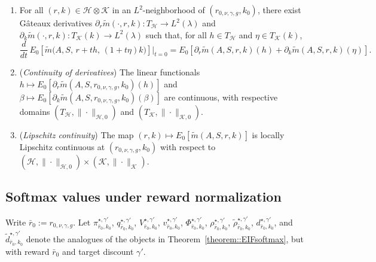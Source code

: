 \documentclass[11pt]{article}
\theoremstyle{plain}
\begin{document}
\begin{enumerate}[label=\textbf{(C\arabic**)}, ref=C\arabic**, series=cond2, start=1]
\item \label{cond::boundedfunc::norm} For all $(r,k) \in \mathcal{H} \otimes \mathcal{K}$ in an $L^2$-neighborhood of $(r_{0,\nu,\gamma,g}, k_0)$, there exist Gâteaux derivatives
$\partial_r \tilde{m}(\cdot, r, k) : T_{\mathcal{H}} \to L^2(\lambda)$
and $\partial_k \tilde{m}(\cdot, r, k) : T_{\mathcal{K}}(k) \to L^2(\lambda)$
such that, for all $h \in T_{\mathcal{H}}$ and $\eta \in T_{\mathcal{K}}(k)$,
\[
   \frac{d}{dt}\, E_0\!\left[\tilde{m}\big(A,S,\, r + t h,\,(1+t\eta)k\big)\right]\Big|_{t=0}
   = E_0\!\left[\partial_r \tilde{m}(A,S,r,k)(h) + \partial_k \tilde{m}(A,S,r,k)(\eta)\right].
\]
\item (\textit{Continuity of derivatives}) \label{cond::boundedfunc2::norm} The linear functionals $h \mapsto E_0[\partial_r \tilde{m}(A,S,r_{0,\nu,\gamma,g},k_0)(h)]$ and
    $\beta \mapsto E_0[\partial_k \tilde{m}(A,S,r_{0,\nu,\gamma,g},k_0)(\beta)]$ are continuous,
    with respective domains $(T_{\mathcal{H}}, \|\cdot\|_{\mathcal{H}, 0})$ and
    $(T_{\mathcal{K}}, \|\cdot\|_{\mathcal{K}, 0})$.
\item (\textit{Lipschitz continuity}) \label{cond::lipschitz::norm} The map $(r,k) \mapsto E_0[\tilde{m}(A,S,r,k)]$ is locally Lipschitz continuous at $(r_{0,\nu,\gamma,g},k_0)$ with respect to $(\mathcal{H}, \|\cdot\|_{\mathcal{H}, 0}) \times (\mathcal{K}, \|\cdot\|_{\mathcal{K}})$.
\end{enumerate}

\subsection{Softmax values under reward normalization}

Write \(\bar r_0 := r_{0,\nu,\gamma,g}\). Let
\(\pi_{\bar r_0,k_0}^{\star,\gamma'}\),
\(q_{\bar r_0,k_0}^{\star,\gamma'}\),
\(V_{\bar r_0,k_0}^{\star,\gamma'}\),
\(v_{\bar r_0,k_0}^{\star,\gamma'}\),
\(\Phi_{\bar r_0,k_0}^{\star,\gamma'}\),
\(\rho_{\bar r_0,k_0}^{\star,\gamma'}\),
\(\widetilde \rho_{\bar r_0,k_0}^{\star,\gamma'}\),
\(d_{\bar r_0,k_0}^{\star,\gamma'}\), and
\(\widetilde d_{\bar r_0,k_0}^{\star,\gamma'}\) denote the analogues of the
objects in Theorem~\ref{theorem::EIFsoftmax}, but with reward \(\bar r_0\) and
target discount \(\gamma'\).
\end{document}
